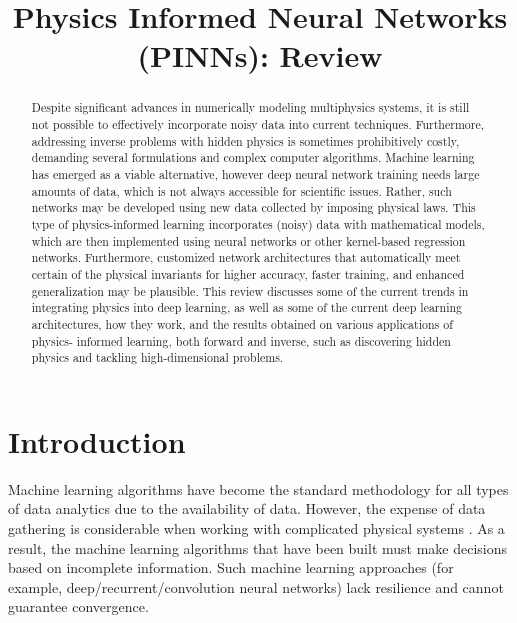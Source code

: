 \documentclass[conference,compsoc]{IEEEtran}
\begin{document}
\title{Physics Informed Neural Networks (PINNs): Review}

\author{
}

\maketitle


\begin{abstract}
Despite significant advances in numerically modeling multiphysics systems, it is still not possible to effectively incorporate noisy data into current techniques. Furthermore, addressing inverse problems with hidden physics is sometimes prohibitively costly, demanding several formulations and complex computer algorithms. Machine learning has emerged as a viable alternative, however deep neural network training needs large amounts of data, which is not always accessible for scientific issues. Rather, such networks may be developed using new data collected by imposing physical laws. This type of physics-informed learning incorporates (noisy) data with mathematical models, which are then implemented using neural networks or other kernel-based regression networks. Furthermore, customized network architectures that automatically meet certain of the physical invariants for higher accuracy, faster training, and enhanced generalization may be plausible. This review discusses some of the current trends in integrating physics into deep learning, as well as some of the current deep learning architectures, how they work, and the results obtained on various applications of physics- informed learning, both forward and inverse, such as discovering hidden physics and tackling high-dimensional problems.

\end{abstract}

\section{Introduction}


Machine learning algorithms have become the standard methodology for all types of data analytics due to the availability of data\cite{raissi2019physics}\cite{lou2020physics}\cite{karniadakis2021physics}. However, the expense of data gathering is considerable when working with complicated physical systems \cite{cai2021physics}. As a result, the machine learning algorithms that have been built must make decisions based on incomplete information\cite{karniadakis2021physics}. Such machine learning approaches (for example, deep/recurrent/convolution neural networks) lack resilience and cannot guarantee convergence\cite{raissi2019physics}.
\end{document}
